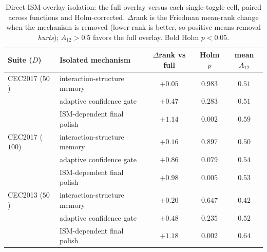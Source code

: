 \documentclass[algorithms,article,submit,moreauthors,pdftex]{Definitions/mdpi}
\begin{document}
\begin{table}[H]
\caption{Direct ISM-overlay isolation: the full overlay versus each
single-toggle cell, paired across functions and Holm-corrected. $\Delta$rank is
the Friedman mean-rank change when the mechanism is removed (lower rank is
better, so positive means removal \emph{hurts}); $A_{12} > 0.5$ favors the full
overlay.  Bold Holm $p < 0.05$.}\label{tab:ism-isolation}
\small\centering
\begin{tabular}{llccc}
\toprule
Suite ($D$) & Isolated mechanism & $\Delta$rank vs full & Holm $p$ & mean $A_{12}$\\
\midrule
CEC2017 ($50$)  & interaction-structure memory & $+0.05$ & $0.983$          & $0.51$\\
                & adaptive confidence gate     & $+0.47$ & $0.283$          & $0.51$\\
                & ISM-dependent final polish   & $+1.14$ & $\mathbf{0.002}$ & $0.59$\\
\addlinespace
CEC2017 ($100$) & interaction-structure memory & $+0.16$ & $0.897$          & $0.50$\\
                & adaptive confidence gate     & $+0.86$ & $0.079$          & $0.54$\\
                & ISM-dependent final polish   & $+0.98$ & $\mathbf{0.005}$ & $0.53$\\
\addlinespace
CEC2013 ($50$)  & interaction-structure memory & $+0.20$ & $0.647$          & $0.42$\\
                & adaptive confidence gate     & $+0.48$ & $0.235$          & $0.52$\\
                & ISM-dependent final polish   & $+1.18$ & $\mathbf{0.002}$ & $0.64$\\
\bottomrule
\end{tabular}
\end{table}
\end{document}
